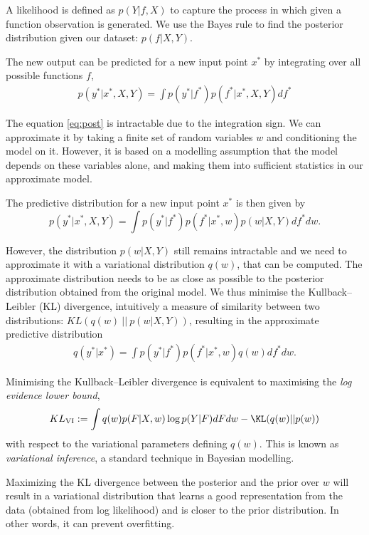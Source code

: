 A likelihood is defined as $p(Y | f, X)$ to capture the process in which given a function observation is generated. We use the Bayes rule to find the posterior distribution given our dataset: $p(f | X, Y)$.

The new output can be predicted for a new input point $x^*$ by integrating over all possible functions $f$,
\begin{align} \label{eq:post}
p(y^* | x^*, X, Y) = \int p(y^* | f^*) p(f^* | x^*, X, Y) df^*
\end{align}

The equation \eqref{eq:post} is intractable due to the integration sign. We can approximate it by taking a finite set of random variables $w$ and conditioning the model on it. However, it is based on a modelling assumption that the model depends on these variables alone, and making them into sufficient statistics in our approximate model.

The predictive distribution for a new input point $x^*$ is then given by 
$$
p(y^* | x^*, X, Y) = \int p(y^* | f^*) p(f^* | x^*, w) p(w | X, Y) df^* d w.
$$

However, the distribution $p(w | X, Y)$ still remains intractable and we need to approximate it with a variational distribution $q(w)$, that can be computed. The approximate distribution needs to be as close as possible to the posterior distribution obtained from the original model. We thus minimise the Kullback--Leibler (KL) divergence, intuitively a measure of similarity between two distributions: $KL(q(w) ~||~ p(w | X, Y))$,
resulting in the approximate predictive distribution 
\begin{align} \label{eq:predictive}
q(y^* | x^*) = \int p(y^* | f^*) p(f^* | x^*, w) q(w)  df^* dw.
\end{align}

Minimising the Kullback--Leibler divergence is equivalent to maximising the \textit{log evidence lower bound},
\begin{align}
KL_{\text{VI}} := \int q(w) p(F | X, w) \log p(Y | F) dF dw - \KL(q(w) || p(w)) \label{eq:L:VI}
\end{align}
with respect to the variational parameters defining $q(w)$. This is known as \textit{variational inference}, a standard technique in Bayesian modelling.

Maximizing the KL divergence between the posterior and the prior over $w$ will result in a variational distribution that learns a good representation from the data (obtained from log likelihood) and is closer to the prior distribution. In other words, it can prevent overfitting. 


